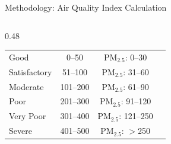 \documentclass[aspectratio=169,10pt]{beamer}
\begin{document}
\begin{frame}{Methodology: Air Quality Index Calculation}
\begin{columns}[T]
\begin{column}{0.48\textwidth}
        \scriptsize
        \renewcommand{\arraystretch}{1.05}
        \begin{tabular}{p{1.8cm}ccc}
            \rowcolor{green!20} Good & 0--50 & PM$_{2.5}$: 0--30 \\
            \rowcolor{yellow!20} Satisfactory & 51--100 & PM$_{2.5}$: 31--60 \\
            \rowcolor{orange!20} Moderate & 101--200 & PM$_{2.5}$: 61--90 \\
            \rowcolor{red!15} Poor & 201--300 & PM$_{2.5}$: 91--120 \\
            \rowcolor{purple!15} Very Poor & 301--400 & PM$_{2.5}$: 121--250 \\
            \rowcolor{red!30} Severe & 401--500 & PM$_{2.5}$: $>$250 \\
        \end{tabular}

        \vspace{0.2cm}

    \end{column}
\end{columns}
\end{frame}
\end{document}
